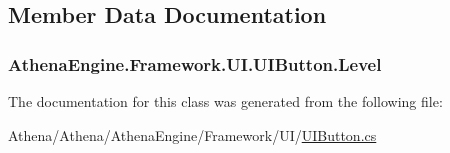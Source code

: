 \subsection{Member Data Documentation}
\hypertarget{class_athena_engine_1_1_framework_1_1_u_i_1_1_u_i_button_a11fe0fd5a2e15a336ca9a42d779dd3a3}{
\subsubsection[{Level}]{ Athena\-Engine.\-Framework.\-U\-I.\-U\-I\-Button.\-Level}}\label{class_athena_engine_1_1_framework_1_1_u_i_1_1_u_i_button_a11fe0fd5a2e15a336ca9a42d779dd3a3}


The documentation for this class was generated from the following file\-:\begin{DoxyCompactItemize}
\item 
Athena/\-Athena/\-Athena\-Engine/\-Framework/\-U\-I/\hyperlink{_u_i_button_8cs}{U\-I\-Button.\-cs}\end{DoxyCompactItemize}
